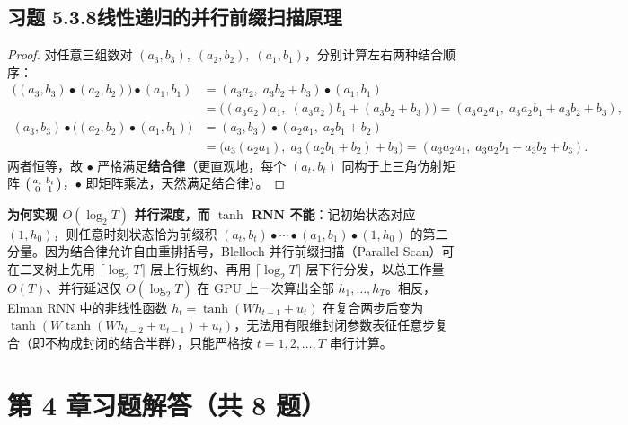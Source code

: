 \subsection*{习题 5.3.8\quad 线性递归的并行前缀扫描原理}
\begin{proof}
对任意三组数对 $(a_3, b_3),\; (a_2, b_2),\; (a_1, b_1)$，分别计算左右两种结合顺序：
\begin{align*}
  \big((a_3, b_3) \bullet (a_2, b_2)\big) \bullet (a_1, b_1)
  &= (a_3 a_2,\; a_3 b_2 + b_3) \bullet (a_1, b_1) \\
  &= \big((a_3 a_2) a_1,\; (a_3 a_2) b_1 + (a_3 b_2 + b_3)\big)
   = (a_3 a_2 a_1,\; a_3 a_2 b_1 + a_3 b_2 + b_3), \\
  (a_3, b_3) \bullet \big((a_2, b_2) \bullet (a_1, b_1)\big)
  &= (a_3, b_3) \bullet (a_2 a_1,\; a_2 b_1 + b_2) \\
  &= \big(a_3(a_2 a_1),\; a_3(a_2 b_1 + b_2) + b_3\big)
   = (a_3 a_2 a_1,\; a_3 a_2 b_1 + a_3 b_2 + b_3).
\end{align*}
两者恒等，故 $\bullet$ 严格满足\textbf{结合律}（更直观地，每个 $(a_t, b_t)$ 同构于上三角仿射矩阵 $\begin{psmallmatrix} a_t & b_t \\ 0 & 1 \end{psmallmatrix}$，$\bullet$ 即矩阵乘法，天然满足结合律）。
\end{proof}
\textbf{为何实现 $O(\log_2 T)$ 并行深度，而 $\tanh$ RNN 不能}：记初始状态对应 $(1, h_0)$，则任意时刻状态恰为前缀积 $(a_t, b_t) \bullet \cdots \bullet (a_1, b_1) \bullet (1, h_0)$ 的第二分量。因为结合律允许自由重排括号，Blelloch 并行前缀扫描（Parallel Scan）可在二叉树上先用 $\lceil \log_2 T \rceil$ 层上行规约、再用 $\lceil \log_2 T \rceil$ 层下行分发，以总工作量 $O(T)$、并行延迟仅 $O(\log_2 T)$ 在 GPU 上一次算出全部 $h_1, \dots, h_T$。相反，Elman RNN 中的非线性函数 $h_t = \tanh(W h_{t-1} + u_t)$ 在复合两步后变为 $\tanh(W \tanh(W h_{t-2} + u_{t-1}) + u_t)$，无法用有限维封闭参数表征任意步复合（即不构成封闭的结合半群），只能严格按 $t = 1, 2, \dots, T$ 串行计算。

\section*{第 4 章习题解答（共 8 题）}

